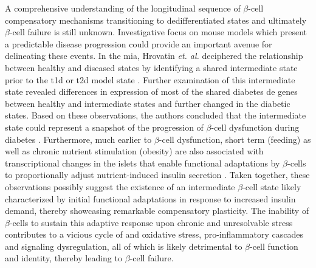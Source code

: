 A comprehensive understanding of the longitudinal sequence of $\beta$-cell compensatory mechanisms transitioning to dedifferentiated states and ultimately $\beta$-cell failure is still unknown. Investigative focus on mouse models which present a predictable disease progression could provide an important avenue for delineating these events. In the \gls{mia}, Hrovatin \textit{et. al.} deciphered the relationship between healthy and diseased states by identifying a shared intermediate state prior to the \gls{t1d} or \gls{t2d} model state \textbf{\cite{hrovatin_delineating_2023}}. Further examination of this intermediate state revealed differences in expression of most of the shared diabetes \gls{de} genes between healthy and intermediate states and further changed in the diabetic states. Based on these observations, the authors concluded that the intermediate state could represent a snapshot of the progression of $\beta$-cell dysfunction during diabetes \textbf{\cite{hrovatin_delineating_2023}}. Furthermore, much earlier to $\beta$-cell dysfunction, short term (feeding) as well as chronic nutrient stimulation (obesity) are also associated with transcriptional changes in the islets that enable functional adaptations by $\beta$-cells to proportionally adjust nutrient-induced insulin secretion \textbf{\cite{wortham_nutrient_2023}}. Taken together, these observations possibly suggest the existence of an intermediate $\beta$-cell state likely characterized by initial functional adaptations in response to increased insulin demand, thereby showcasing remarkable compensatory plasticity. The inability of $\beta$-cells to sustain this adaptive response upon chronic and unresolvable stress contributes to a vicious cycle of  and oxidative stress, pro-inflammatory cascades and signaling dysregulation, all of which is likely detrimental to $\beta$-cell function and identity, thereby leading to $\beta$-cell failure.\\










